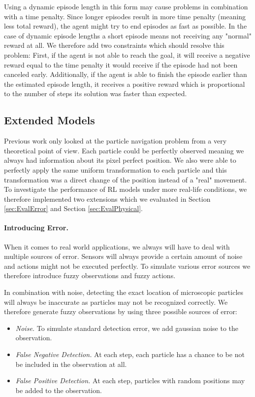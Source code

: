 Using a dynamic episode length in this form may cause problems in combination with a time penalty. Since longer episodes result in more time penalty (meaning less total reward), the agent might try to end episodes as fast as possible. In the case of dynamic episode lengths a short episode means not receiving any "normal" reward at all. We therefore add two constraints which should resolve this problem: First, if the agent is not able to reach the goal, it will receive a negative reward equal to the time penalty it would receive if the episode had not been canceled early. Additionally, if the agent is able to finish the episode earlier than the estimated episode length, it receives a positive reward which is proportional to the number of steps its solution was faster than expected.

\subsection{Extended Models} \label{sec:ExtendedMaze}
Previous work only looked at the particle navigation problem from a very theoretical point of view. Each particle could be perfectly observed meaning we always had information about its pixel perfect position. We also were able to perfectly apply the same uniform transformation to each particle and this transformation was a direct change of the position instead of a "real" movement. To investigate the performance of RL models under more real-life conditions, we therefore implemented two extensions which we evaluated in Section \ref{sec:EvalError} and Section \ref{sec:EvalPhysical}.

\paragraph{Introducing Error.}
When it comes to real world applications, we always will have to deal with multiple sources of error. Sensors will always provide a certain amount of noise and actions might not be executed perfectly. To simulate various error sources we therefore introduce fuzzy observations and fuzzy actions.  

In combination with noise, detecting the exact location of microscopic particles will always be inaccurate as particles may not be recognized correctly. We therefore generate fuzzy observations by using three possible sources of error:

\begin{itemize}
    \item \textit{Noise.} To simulate standard detection error, we add gaussian noise to the observation.
    \item \textit{False Negative Detection.} At each step, each particle has a chance to be not be included in the observation at all.
    \item \textit{False Positive Detection.} At each step, particles with random positions may be added to the observation.
\end{itemize}

